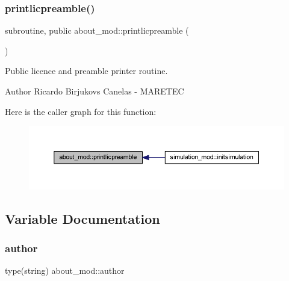 \subsubsection{\texorpdfstring{printlicpreamble()}{printlicpreamble()}}
{\footnotesize\ttfamily subroutine, public about\+\_\+mod\+::printlicpreamble (\begin{DoxyParamCaption}{ }\end{DoxyParamCaption})}



Public licence and preamble printer routine. 

\begin{DoxyAuthor}{Author}
Ricardo Birjukovs Canelas -\/ M\+A\+R\+E\+T\+EC 
\end{DoxyAuthor}
Here is the caller graph for this function\+:\nopagebreak
\begin{figure}[H]
\begin{center}
\leavevmode
\includegraphics[width=350pt]{namespaceabout__mod_a9fb866e1576b843b42649d84b80f4b52_icgraph}
\end{center}
\end{figure}


\subsection{Variable Documentation}
\mbox{\label{namespaceabout__mod_a7c3a72ae7ba5fc7d8a4bf133605f58c3}} 
\subsubsection{\texorpdfstring{author}{author}}
{\footnotesize\ttfamily type(string) about\+\_\+mod\+::author\hspace{0.3cm}{\ttfamily [private]}}

\mbox{\label{namespaceabout__mod_aaac12f65380fb0f10916b3744d9e5a0b}} 
